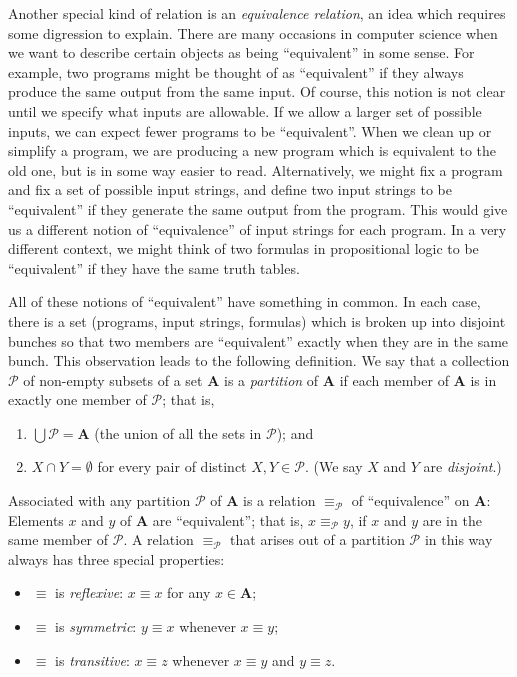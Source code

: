 \documentclass{article}
\newcommand{\Ps}{\mathcal P}
\newcommand{\A}{\mathbf A}
\begin{document}
Another special kind of relation is an \emph{equivalence relation}, an idea which requires some digression to explain. There are many occasions in computer science when we want to describe certain objects as being ``equivalent'' in some sense. For example, two programs might be thought of as ``equivalent'' if they always produce the same output from the same input. Of course, this notion is not clear until we specify what inputs are allowable. If we allow a larger set of possible inputs, we can expect fewer programs to be ``equivalent''. When we clean up or simplify a program, we are producing a new program which is equivalent to the old one, but is in some way easier to read. Alternatively, we might fix a program and fix a set of possible input strings, and define two input strings to be ``equivalent'' if they generate the same output from the program. This would give us a different notion of ``equivalence'' of input strings for each program. In a very different context, we might think of two formulas in propositional logic to be ``equivalent'' if they have the same truth tables.

All of these notions of ``equivalent'' have something in common. In each case, there is a set (programs, input strings, formulas) which is broken up into disjoint bunches so that two members are ``equivalent'' exactly when they are in the same bunch. This observation leads to the following definition. We say that a collection $\Ps$ of non-empty subsets of a set $\A$ is a \emph{partition} of $\A$ if each member of $\A$ is in exactly one member of $\Ps$; that is,
\begin{enumerate}
  \item $\bigcup \Ps = \A$ (the union of all the sets in $\Ps$); and
  \item $X \cap Y = \emptyset$ for every pair of distinct $X,Y \in \Ps$. (We say $X$ and $Y$ are \emph{disjoint}.)
\end{enumerate}

Associated with any partition $\Ps$ of $\A$ is a relation $\equiv_{\Ps}$ of ``equivalence'' on $\A$: Elements $x$ and $y$ of $\A$ are ``equivalent''; that is, $x \equiv_{\Ps} y$, if $x$ and $y$ are in the same member of $\Ps$. A relation $\equiv_{\Ps}$ that arises out of a partition $\Ps$ in this way always has three special properties:
\begin{itemize}
  \item $\equiv$ is \emph{reflexive}: $x \equiv x$ for any $x \in \A$;
  \item $\equiv$ is \emph{symmetric}: $y \equiv x$ whenever $x \equiv y$;
  \item $\equiv$ is \emph{transitive}: $x \equiv z$ whenever $x \equiv y$ and $y \equiv z$.
\end{itemize}
\end{document}
